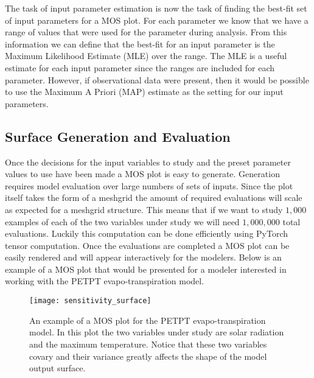 The task of input parameter estimation is now the task of finding the best-fit set of input parameters for a MOS plot. For each parameter we know that we have a range of values that were used for the parameter during analysis. From this information we can define that the best-fit for an input parameter is the Maximum Likelihood Estimate (MLE) over the range. The MLE is a useful estimate for each input parameter since the ranges are included for each parameter. However, if observational data were present, then it would be possible to use the Maximum A Priori (MAP) estimate as the setting for our input parameters.

\subsection{Surface Generation and Evaluation\label{sec:surf_usage}}
Once the decisions for the input variables to study and the preset parameter values to use have been made a MOS plot is easy to generate.
Generation requires model evaluation over large numbers of sets of inputs.
Since the plot itself takes the form of a meshgrid the amount of required evaluations will scale as expected for a meshgrid structure.
This means that if we want to study $1,000$ examples of each of the two variables under study we will need $1,000,000$ total evaluations.
Luckily this computation can be done efficiently using PyTorch tensor computation.
Once the evaluations are completed a MOS plot can be easily rendered and will appear interactively for the modelers. Below is an example of a MOS plot that would be presented for a modeler interested in working with the PETPT evapo-transpiration model.

\FloatBarrier
\begin{figure}[!htbp]
    \label{mos_plot_ex}
    \centering
    \texttt{[image: sensitivity\_surface]}%
    \caption[PETPT Example MOS Plot]{An example of a MOS plot for the PETPT evapo-transpiration model. In this plot the two variables under study are solar radiation and the maximum temperature. Notice that these two variables covary and their variance greatly affects the shape of the model output surface.}
\end{figure}
\FloatBarrier

